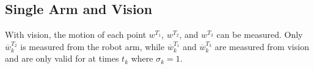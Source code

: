 \documentclass[runningheads,a4paper]{llncs}
\begin{document}



\subsection{Single Arm and Vision \label{sec-w_vis}}
With vision, the motion of each point $w^{T_1}$, $w^{T_2}$, and $w^{T_3}$ can be measured. Only $\overline{w}_k^{T_2}$ is measured from the robot arm, while $\overline{w}_k^{T_1}$ and $\overline{w}_k^{T_3}$ are measured from vision and are only valid for at times $t_k$ where $\sigma_k = 1$.

\end{document}
